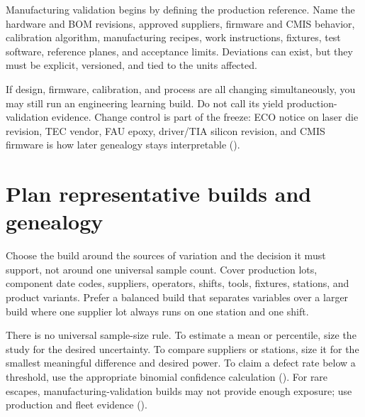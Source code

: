 Manufacturing validation begins by defining the production reference. Name the
hardware and BOM revisions, approved suppliers, firmware and CMIS behavior,
calibration algorithm, manufacturing recipes, work instructions, fixtures, test
software, reference planes, and acceptance limits. Deviations can exist, but
they must be explicit, versioned, and tied to the units affected.

If design, firmware, calibration, and process are all changing simultaneously,
you may still run an engineering learning build. Do not call its yield
production-validation evidence. Change control is part of the freeze: ECO notice
on laser die revision, TEC vendor, FAU epoxy, driver/TIA silicon revision, and
CMIS firmware is how later genealogy stays interpretable
().

\section{Plan representative builds and genealogy}
\label{sec:mfg-builds-genealogy}

Choose the build around the sources of variation and the decision it must
support, not around one universal sample count. Cover production lots, component
date codes, suppliers, operators, shifts, tools, fixtures, stations, and product
variants. Prefer a balanced build that separates variables over a larger build
where one supplier lot always runs on one station and one shift.


There is no universal sample-size rule. To estimate a mean or percentile, size
the study for the desired uncertainty. To compare suppliers or stations, size
it for the smallest meaningful difference and desired power. To claim a defect
rate below a threshold, use the appropriate binomial confidence calculation
(). For rare escapes, manufacturing-validation
builds may not provide enough exposure; use production and fleet evidence
().

